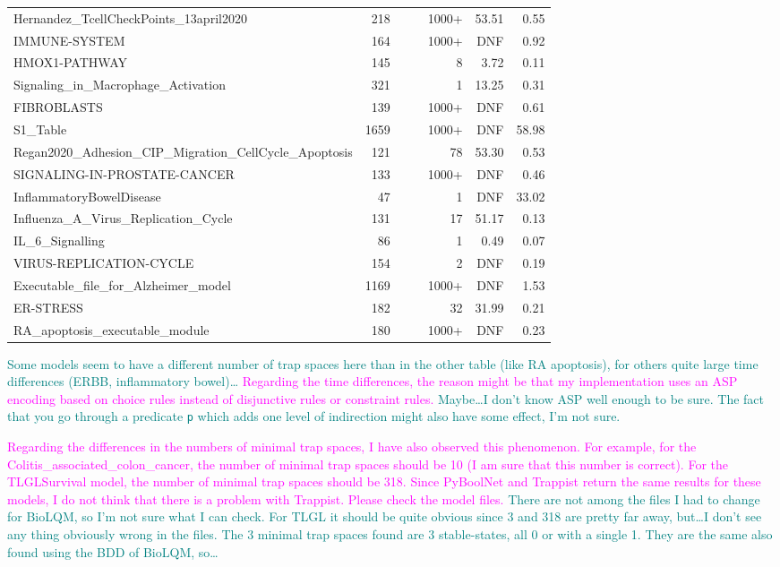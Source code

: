 \documentclass[runningheads]{llncs}
\newcommand{\vangiang}[1]{\textcolor{magenta}{#1}}
\newcommand{\sylvain}[1]{\textcolor{teal}{#1}}
\begin{document}
\begin{table}[!htb]
\begin{tabular}{lrrrrrr}
    Hernandez\_TcellCheckPoints\_13april2020 & 218 &&& 1000+ & 53.51 & 0.55\\
    IMMUNE-SYSTEM & 164 &&& 1000+ & DNF & 0.92\\
    HMOX1-PATHWAY & 145 &&& 8 & 3.72 & 0.11\\
    Signaling\_in\_Macrophage\_Activation & 321 &&& 1 & 13.25 & 0.31\\
    FIBROBLASTS & 139 &&& 1000+ & DNF & 0.61\\
    S1\_Table & 1659 &&& 1000+ & DNF & 58.98\\
    Regan2020\_Adhesion\_CIP\_Migration\_CellCycle\_Apoptosis & 121 &&& 78 & 53.30 & 0.53\\
    SIGNALING-IN-PROSTATE-CANCER & 133 &&& 1000+ & DNF & 0.46\\
    InflammatoryBowelDisease & 47 &&& 1 & DNF & 33.02\\
    Influenza\_A\_Virus\_Replication\_Cycle & 131 &&& 17 & 51.17 & 0.13\\
    IL\_6\_Signalling & 86 &&& 1 & 0.49 & 0.07\\
    VIRUS-REPLICATION-CYCLE & 154 &&& 2 & DNF & 0.19\\
    Executable\_file\_for\_Alzheimer\_model & 1169 &&& 1000+ & DNF & 1.53\\
    ER-STRESS & 182 &&& 32 & 31.99 & 0.21\\
    RA\_apoptosis\_executable\_module & 180 &&& 1000+ & DNF & 0.23\\
    \bottomrule
  \end{tabular}
\end{table}

\sylvain{Some models seem to have a different number of trap spaces here than in the other table (like RA apoptosis), for others quite large time differences (ERBB, inflammatory bowel)\dots}
\vangiang{Regarding the time differences, the reason might be that my implementation uses an ASP encoding based on choice rules instead of disjunctive rules or constraint rules.}
\sylvain{Maybe\dots I don't know ASP well enough to be sure. The fact that you go through a predicate \texttt{p} which adds one level of indirection might also have some effect, I'm not sure.}

\vangiang{Regarding the differences in the numbers of minimal trap spaces, I have also observed this phenomenon. For example, for the Colitis\_associated\_colon\_cancer, the number of minimal trap spaces should be 10 (I am sure that this number is correct). For the TLGLSurvival model, the number of minimal trap spaces should be 318. Since PyBoolNet and Trappist return the same results for these models, I do not think that there is a problem with Trappist. Please check the model files.}
\sylvain{There are not among the files I had to change for BioLQM, so I'm not sure what I can check. For TLGL it should be quite obvious since 3 and 318 are pretty far away, but\dots I don't see any thing obviously wrong in the files. The 3 minimal trap spaces found are 3 stable-states, all 0 or with a single 1. They are the same also found using the BDD of BioLQM, so\dots}
\end{document}
